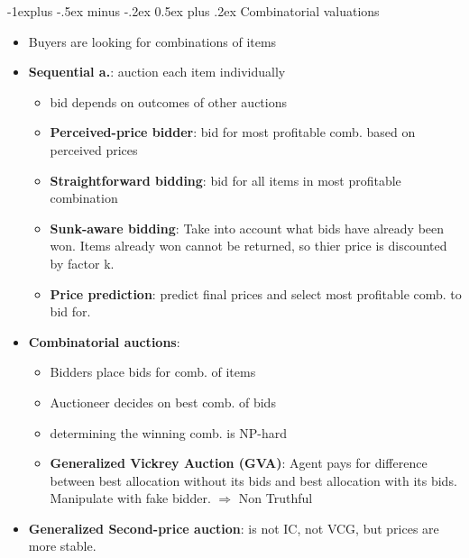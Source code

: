 \documentclass[10pt,a4paper,landscape]{article}
\makeatletter
\renewcommand{\subsection}{\@startsection{subsection}{2}{0mm}%
                                {-1explus -.5ex minus -.2ex}%
                                {0.5ex plus .2ex}%
                                {\normalfont\tiny\bfseries}}
\makeatother
\begin{document}
\begin{multicols*}{5}
\subsection{Combinatorial valuations}
\begin{itemize}
	\item Buyers are looking for combinations of items
	\item \textbf{Sequential a.}: auction each item individually
	\begin{itemize}
		\item bid depends on outcomes of other auctions
		\item \textbf{Perceived-price bidder}: bid for most profitable comb. based on perceived prices
		\item \textbf{Straightforward bidding}: bid for all items in most profitable combination
		\item \textbf{Sunk-aware bidding}: Take into account what bids have already been won. Items already won cannot be returned, so thier price is discounted by factor k.
		\item \textbf{Price prediction}: predict final prices and select most profitable comb. to bid for.
	\end{itemize}
	\item \textbf{Combinatorial auctions}:
	\begin{itemize}
		\item Bidders place bids for comb. of items
		\item Auctioneer decides on best comb. of bids
		\item determining the winning comb. is NP-hard
		\item \textbf{Generalized Vickrey Auction (GVA)}: Agent pays for difference between best allocation without its bids and best allocation with its bids. Manipulate with fake bidder. $\Rightarrow$ Non Truthful
	\end{itemize}
	\item \textbf{Generalized Second-price auction}: is not IC, not VCG, but prices are more stable.
\end{itemize}



\end{multicols*}
\end{document}
